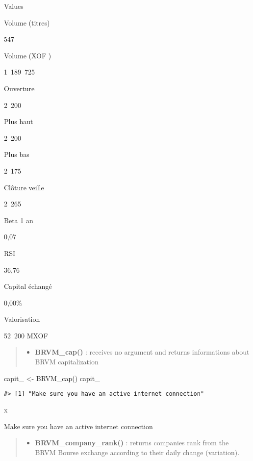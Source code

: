 \documentclass[
]{article}
\newenvironment{Shaded}{\begin{snugshade}}{\end{snugshade}}
\newcommand{\FunctionTok}[1]{\textcolor[rgb]{0.00,0.00,0.00}{#1}}
\newcommand{\NormalTok}[1]{#1}
\newcommand{\OtherTok}[1]{\textcolor[rgb]{0.56,0.35,0.01}{#1}}
\providecommand{\tightlist}{%
  \setlength{\itemsep}{0pt}\setlength{\parskip}{0pt}}
\begin{document}
Values

Volume (titres)

547

Volume (XOF )

1~189~725

Ouverture

2~200

Plus haut

2~200

Plus bas

2~175

Clôture veille

2~265

Beta 1 an

0,07

RSI

36,76

Capital échangé

0,00\%

Valorisation

52~200 MXOF

\begin{quote}
\begin{itemize}
\tightlist
\item
  \textbf{BRVM\_cap()} : receives no argument and returns informations
  about BRVM capitalization
\end{itemize}
\end{quote}

\begin{Shaded}
\begin{Highlighting}[]
\NormalTok{capit\_ }\OtherTok{\textless{}{-}} \FunctionTok{BRVM\_cap}\NormalTok{()}
\NormalTok{capit\_}
\end{Highlighting}
\end{Shaded}

\begin{verbatim}
#> [1] "Make sure you have an active internet connection"
\end{verbatim}

x

Make sure you have an active internet connection

\begin{quote}
\begin{itemize}
\tightlist
\item
  \textbf{BRVM\_company\_rank()} : returns companies rank from the BRVM
  Bourse exchange according to their daily change (variation).
\end{itemize}
\end{quote}
\end{document}
